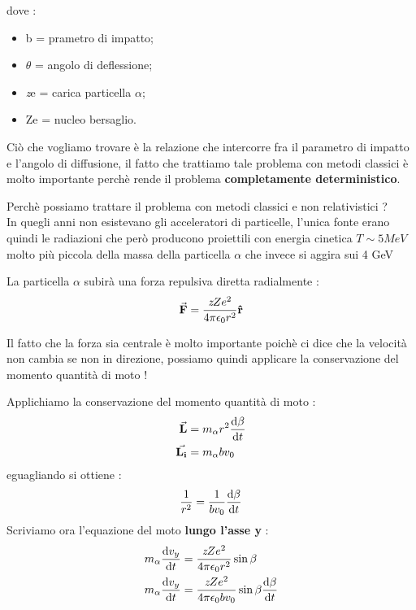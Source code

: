dove : 
\begin{itemize}
        \item b = prametro di impatto; 
        \item $\theta$ = angolo di deflessione;
        \item \textit{z}e = carica particella $\alpha$; 
        \item Ze = nucleo bersaglio.
\end{itemize}
Ciò che vogliamo trovare è la relazione che intercorre fra il parametro di impatto e l'angolo
di diffusione, il fatto che trattiamo tale problema con metodi classici è molto importante 
perchè rende il problema \textbf{completamente deterministico}. \\
\begin{tcolorbox}[colback=red!5!white,colframe=red!50!black,title=ATTENZIONE !]
Perchè possiamo trattare il problema con metodi classici e non relativistici ? \\
In quegli anni non esistevano gli acceleratori di particelle, l'unica fonte erano quindi le radiazioni
che però producono proiettili con energia cinetica $T \sim 5MeV$ molto più piccola della massa della 
particella $\alpha$ che invece si aggira sui 4 GeV
\end{tcolorbox}
\newpage
La particella $\alpha$ subirà una forza repulsiva diretta radialmente :
\begin{align*}
    \va{F} = \frac{\textit{z}Ze^2}{4\pi \epsilon_{0}r^2}\vu{r}
\end{align*}
\begin{tcolorbox}[colback=red!5!white,colframe=red!50!black,title=ATTENZIONE !]
Il fatto che la forza sia centrale è molto importante poichè ci dice che la velocità non 
cambia se non in direzione, possiamo quindi applicare la conservazione del momento quantità 
di moto !
\end{tcolorbox}
Applichiamo la conservazione del momento quantità di moto : 
\begin{align*}
        \va{L} &= m_{\alpha}r^2\dv{\beta}{t} \\ 
        \va{L_{i}} &= m_{\alpha}bv_{0} 
\end{align*}
eguagliando si ottiene : 
\begin{align*}
    \frac{1}{r^2} = \frac{1}{bv_{0}}\dv{\beta}{t}
\end{align*}
Scriviamo ora l'equazione del moto \textbf{lungo l'asse y} : 
\begin{align*}
        m_{\alpha}\dv{v_{y}}{t} &= \frac{\textit{z}Ze^2}{4\pi\epsilon_{0}r^2}\sin{\beta} \\
        m_{\alpha}\dv{v_{y}}{t} &= \frac{\textit{z}Ze^2}{4\pi\epsilon_{0}bv_{0}}\sin{\beta}\dv{\beta}{t}
\end{align*}

